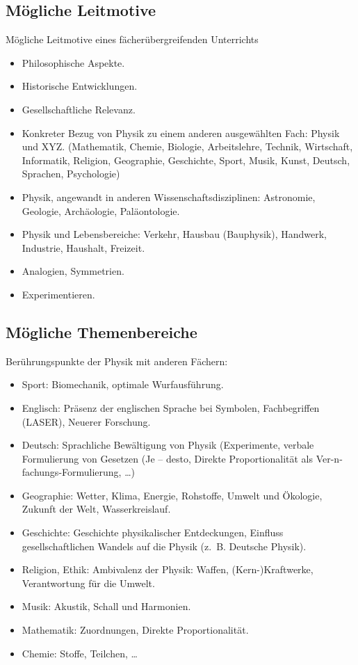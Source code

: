 \subsection{M\"{o}gliche Leitmotive}
M\"{o}gliche Leitmotive eines f\"{a}cher\"{u}bergreifenden Unterrichts
\begin{itemize}
\setlength{\itemsep}{0mm}
\item
Philosophische Aspekte.
\item
Historische Entwicklungen.
\item
Gesellschaftliche Relevanz.
\item
Konkreter Bezug von Physik zu einem anderen ausgew\"{a}hlten Fach: Physik und XYZ.
(Mathematik, Chemie, Biologie, Arbeitslehre, Technik, Wirtschaft,
Informatik, Religion, Geographie, Geschichte, Sport, Musik,
Kunst, Deutsch, Sprachen, Psychologie)
\item
Physik, angewandt in anderen Wissenschaftsdisziplinen:
Astronomie, Geologie, Arch\"{a}ologie, Pal\"{a}ontologie.
\item
Physik und Lebensbereiche:
Verkehr, Hausbau (Bauphysik), Handwerk,
Industrie, Haushalt, Freizeit.
\item
Analogien, Symmetrien.
\item
Experimentieren.
\end{itemize}

\subsection{M\"{o}gliche Themenbereiche}
Berührungspunkte der Physik mit anderen Fächern:

\begin{itemize}
	\item
	Sport: Biomechanik, optimale Wurfausführung.
	\item
	Englisch: Pr\"{a}senz der englischen Sprache bei
	Symbolen, Fachbegriffen (LASER), Neuerer Forschung.
	\item
	Deutsch: Sprachliche Bew\"{a}ltigung von Physik (Experimente,
	verbale Formulierung von Gesetzen (Je -- desto,
	Direkte Proportionalit\"{a}t als Ver-n-fachungs-Formulierung, \dots)
	\item
	Geographie: Wetter, Klima, Energie, Rohstoffe, Umwelt und \"{O}kologie, Zukunft der Welt, Wasserkreislauf.
	\item
	Geschichte: Geschichte physikalischer Entdeckungen, Einfluss gesellschaftlichen Wandels auf die Physik (z.~B. Deutsche Physik).
	\item
	Religion, Ethik: Ambivalenz der Physik: Waffen,
	(Kern-)Kraftwerke, Verantwortung f\"{u}r die Umwelt.
	\item
	Musik: Akustik, Schall und Harmonien.
	\item
	Mathematik: Zuordnungen, Direkte Proportionalit\"{a}t.
	\item
	Chemie: Stoffe, Teilchen, \dots
\end{itemize}

